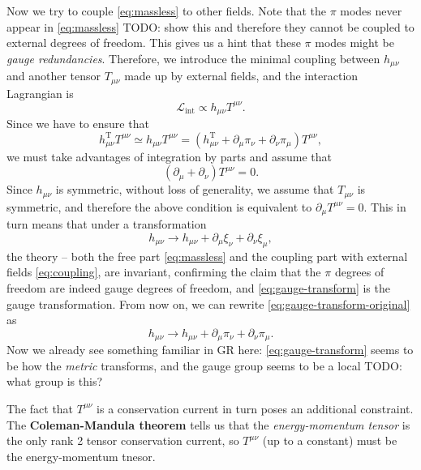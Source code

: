 \documentclass[hyperref, a4paper]{article}
\newcommand*{\concept}[1]{{\textbf{#1}}}
\begin{document}
Now we try to couple \eqref{eq:massless} to other fields. Note that the $\pi$ modes never appear 
in \eqref{eq:massless} TODO: show this 
and therefore they cannot be coupled to external degrees of freedom. This 
gives us a hint that these $\pi$ modes might be \emph{gauge redundancies}. Therefore, we introduce the minimal 
coupling between $h_{\mu \nu}$ and another tensor $T_{\mu \nu}$ made up by external fields, and the 
interaction Lagrangian is 
\begin{equation}
    \mathcal{L}_\text{int} \propto h_{\mu \nu} T^{\mu \nu} .
    \label{eq:coupling}
\end{equation}
Since we have to ensure that 
\[
    h_{\mu \nu}^\text{T} T^{\mu \nu} \simeq h_{\mu \nu} T^{\mu \nu} = (h_{\mu \nu}^\text{T} + \partial_\mu \pi_\nu + \partial_\nu \pi_\mu) T^{\mu \nu},
\] 
we must take advantages of integration by parts and assume that 
\[
    (\partial_\mu + \partial_\nu) T^{\mu \nu} = 0.
\]
Since $h_{\mu \nu}$ is symmetric, without loss of generality, we assume that $T_{\mu \nu}$ is symmetric, and 
therefore the above condition is equivalent to $\partial_\mu T^{\mu \nu} = 0$. This in turn means that 
under a transformation 
\begin{equation}
    h_{\mu \nu} \longrightarrow h_{\mu \nu} + \partial_\mu \xi_\nu + \partial_\nu \xi_\mu,
    \label{eq:gauge-transform-original}
\end{equation}
the theory -- both the free part \eqref{eq:massless} and the coupling part with external fields \eqref{eq:coupling},
are invariant, confirming the claim that the $\pi$ degrees of freedom are indeed gauge degrees of freedom, and 
\eqref{eq:gauge-transform} is the gauge transformation. From now on, we can rewrite \eqref{eq:gauge-transform-original} as 
\begin{equation}
    h_{\mu \nu} \longrightarrow h_{\mu \nu} + \partial_\mu \pi_\nu + \partial_\nu \pi_\mu.
    \label{eq:gauge-transform}
\end{equation}
Now we already see something familiar in GR here: 
\eqref{eq:gauge-transform} seems to be how the \emph{metric} transforms, and the gauge group seems to be 
a local TODO: what group is this? 

The fact that $T^{\mu \nu}$ is a conservation current in turn poses an additional constraint. The 
\concept{Coleman-Mandula theorem} tells us that the \emph{energy-momentum tensor} is the only rank 2 tensor 
conservation current, so $T^{\mu \nu}$ (up to a constant) must be the energy-momentum tnesor.
\end{document}
